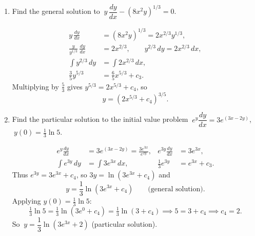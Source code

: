 \documentclass[10pt]{article}
\begin{document}
\begin{enumerate}[leftmargin=*, label=\numbox{\arabic*}]
\item
    \begin{problem}[\vspace{6cm}]
        Find the general solution to \(\ y\,\dfrac{dy}{dx} - \left(8x^2 y\right)^{1/3} = 0\).
    \end{problem}
    \begin{solution}
        \[
        \begin{aligned}
            y\,\frac{dy}{dx} &= (8x^2 y)^{1/3} = 2x^{2/3} y^{1/3}, \\
            \frac{y}{y^{1/3}}\,\frac{dy}{dx} &= 2x^{2/3},
            \qquad y^{2/3}\,dy = 2x^{2/3}\,dx, \\
            \int y^{2/3}\,dy &= \int 2x^{2/3}\,dx, \\
            \frac{3}{5}y^{5/3} &= \frac{6}{5}x^{5/3} + c_3.
        \end{aligned}
        \]
        Multiplying by \(\tfrac{5}{3}\) gives \(y^{5/3} = 2x^{5/3} + c_4\), so
        \[
            y = \left(2x^{5/3} + c_4\right)^{3/5}.
        \]
    \end{solution}

\item
    \begin{problem}[\vspace{6cm}]
        Find the particular solution to the initial value problem
        \(\ e^{y}\dfrac{dy}{dx} = 3 e^{(3x - 2y)}\), \(\ y(0) = \tfrac{1}{3}\ln 5\).
    \end{problem}
    \begin{solution}
        \[
        \begin{aligned}
            e^{y}\frac{dy}{dx} &= 3 e^{(3x - 2y)} = \frac{3 e^{3x}}{e^{2y}}, &
            e^{3y}\frac{dy}{dx} &= 3 e^{3x}, \\
            \int e^{3y}\,dy &= \int 3 e^{3x}\,dx, &
            \frac{1}{3}e^{3y} &= e^{3x} + c_3.
        \end{aligned}
        \]
        Thus \(e^{3y} = 3 e^{3x} + c_4\), so \(3y = \ln(3 e^{3x} + c_4)\) and
        \[
            y = \frac{1}{3}\ln(3 e^{3x} + c_4) \qquad\text{(general solution).}
        \]
        Applying \(y(0) = \tfrac{1}{3}\ln 5\):
        \[
            \tfrac{1}{3}\ln 5 = \tfrac{1}{3}\ln(3 e^0 + c_4) = \tfrac{1}{3}\ln(3 + c_4)
            \implies 5 = 3 + c_4 \implies c_4 = 2.
        \]
        So \(\ y = \dfrac{1}{3}\ln(3 e^{3x} + 2)\) (particular solution).
    \end{solution}

\end{enumerate}
\end{document}
